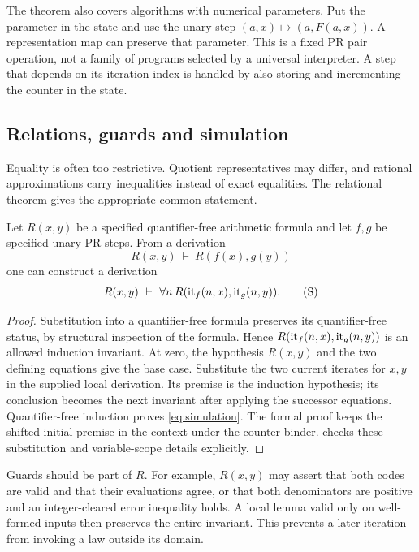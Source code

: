 The theorem also covers algorithms with numerical parameters. Put the
parameter in the state and use the unary step $(a,x)\mapsto(a,F(a,x))$.
A representation map can preserve that parameter. This is a fixed
PR pair operation, not a family of programs selected by a universal
interpreter. A step that depends on its iteration index is handled by
also storing and incrementing the counter in the state.

\subsection{Relations, guards and simulation}

Equality is often too restrictive. Quotient representatives may differ,
and rational approximations carry inequalities instead of exact equalities.
The relational theorem gives the appropriate common statement.

\begin{theorem}\label{thm:simulation}
Let $R(x,y)$ be a specified quantifier-free arithmetic formula and let
$f,g$ be specified unary PR steps. From a derivation
\[
                      R(x,y)\ \vdash\ R(f(x),g(y))
\]
one can construct a derivation
\[
       R(x,y)\ \vdash\ \forall n\,
                      R(\iter_f(n,x),\iter_g(n,y)).
 \tag{S}\label{eq:simulation}
\]
\end{theorem}

\begin{proof}
Substitution into a quantifier-free formula preserves its quantifier-free
status, by structural inspection of the formula. Hence
$R(\operatorname{it}_f(n,x),\operatorname{it}_g(n,y))$ is an allowed induction invariant.
At zero, the hypothesis $R(x,y)$ and the two defining equations give
the base case. Substitute the two current iterates for $x,y$ in the
supplied local derivation. Its premise is the induction hypothesis;
its conclusion becomes the next invariant after applying the successor
equations. Quantifier-free induction proves \eqref{eq:simulation}.
The formal proof keeps the shifted initial premise in the context under
the counter binder.  checks these
substitution and variable-scope details explicitly.
\end{proof}

Guards should be part of $R$. For example,
$R(x,y)$ may assert that both codes are valid and that their evaluations
agree, or that both denominators are positive and an integer-cleared
error inequality holds. A local lemma valid only on well-formed inputs
then preserves the entire invariant. This prevents a later iteration
from invoking a law outside its domain.

